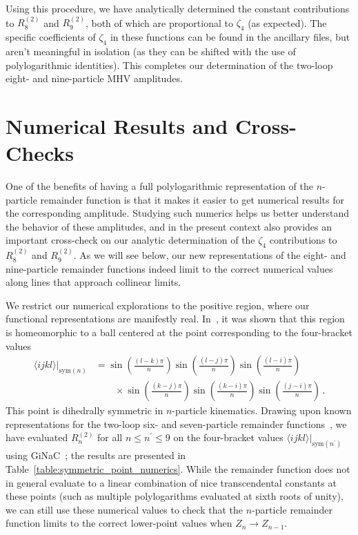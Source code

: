 \documentclass[11pt]{article}
\begin{document}
Using this procedure, we have analytically determined the constant contributions to $R_8^{(2)}$\! and $R_9^{(2)}$\!, both of which are proportional to $\zeta_4$ (as expected). The specific coefficients of $\zeta_4$ in these functions can be found in the ancillary files, but aren't meaningful in isolation (as they can be shifted with the use of polylogarithmic identities). This completes our determination of the two-loop eight- and nine-particle MHV amplitudes.


\section{Numerical Results and Cross-Checks}
\label{sec:numerics}

One of the benefits of having a full polylogarithmic representation of the $n$-particle remainder function is that it makes it easier to get numerical results for the corresponding amplitude. Studying such numerics helps us better understand the behavior of these amplitudes, and in the present context also provides an important cross-check on our analytic determination of the $\zeta_4$ contributions to $R_8^{(2)}$\! and $R_9^{(2)}$\!. As we will see below, our new representations of the eight- and nine-particle remainder functions indeed limit to the correct numerical values along lines that approach collinear limits.

We restrict our numerical explorations to the positive region, where our functional representations are manifestly real. In~\cite{Galashin:2017onl}, it was shown that this region is homeomorphic to a ball centered at the point corresponding to the four-bracket values
\begin{align}
\langle i j k l \rangle \big|_{\text{sym}(n)} &= \sin\left(\frac{(l - k) \pi}{n} \right) \sin\left(\frac{(l - j) \pi}{n} \right) \sin\left(\frac{(l - i) \pi}{n}\right) \nonumber \\
&\qquad \times \sin\left(\frac{(k - j) \pi}{n}\right) \sin\left(\frac{(k - i) \pi}{n}\right) \sin\left(\frac{(j - i) \pi}{n}\right) \, . \label{eq:symmetric_point}
\end{align}
This point is dihedrally symmetric in $n$-particle kinematics. Drawing upon known representations for the two-loop six- and seven-particle remainder functions~\cite{DelDuca:2009au,DelDuca:2010zg,Goncharov:2010jf,Golden:2014xqf}, we have evaluated $R_n^{(2)}$ for all $n \leq n^\prime \leq 9$ on the four-bracket values $\langle i j k l \rangle \big|_{\text{sym}(n^\prime)}$ using {\sc GiNaC}~\cite{Bauer:2000cp,Vollinga:2004sn}; the results are presented in Table~\ref{table:symmetric_point_numerics}. While the  remainder function does not in general evaluate to a linear combination of nice transcendental constants at these points (such as multiple polylogarithms evaluated at sixth roots of unity), we can still use these numerical values to check that the $n$-particle remainder function limits to the correct lower-point values when $Z_n \to Z_{n-1}$. 
\end{document}
